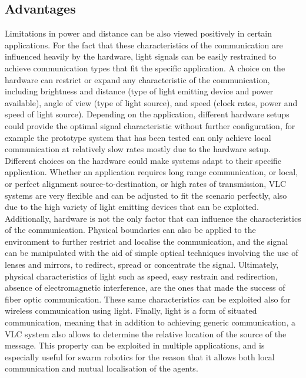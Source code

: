 \subsection{Advantages}
Limitations in power and distance can be also viewed positively in certain applications.
For the fact that these characteristics of the communication are influenced heavily by the hardware, light signals can be easily restrained to achieve communication types that fit the specific application. 
A choice on the hardware can restrict or expand any characteristic of the communication, including brightness and distance (type of light emitting device and power available), angle of view (type of light source), and speed (clock rates, power and speed of light source).
Depending on the application, different hardware setups could provide the optimal signal characteristic without further configuration, for example the prototype system that has been tested can only achieve local communication at relatively slow rates mostly due to the hardware setup.
Different choices on the hardware could make systems adapt to their specific application.
Whether an application requires long range communication, or local, or perfect alignment source-to-destination, or high rates of transmission, VLC systems are very flexible and can be adjusted to fit the scenario perfectly, also due to the high variety of light emitting devices that can be exploited.
Additionally, hardware is not the only factor that can influence the characteristics of the communication.
Physical boundaries can also be applied to the environment to further restrict and localise the communication, and the signal can be manipulated with the aid of simple optical techniques involving the use of lenses and mirrors, to redirect, spread or concentrate the signal.
Ultimately, physical characteristics of light such as speed, easy restrain and redirection, absence of electromagnetic interference, are the ones that made the success of fiber optic communication. 
These same characteristics can be exploited also for wireless communication using light.
\newline
Finally, light is a form of situated communication, meaning that in addition to achieving generic communication, a VLC system also allows to determine the relative location of the source of the message.
This property can be exploited in multiple applications, and is especially useful for swarm robotics for the reason that it allows both local communication and mutual localisation of the agents.

